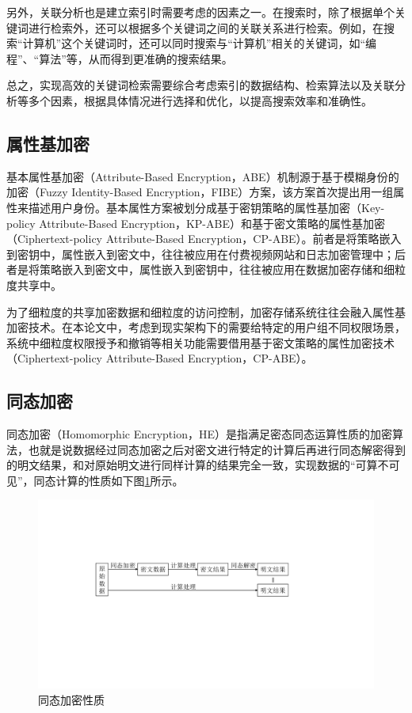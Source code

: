 \documentclass[promaster]{thesis-uestc}
\begin{document}
另外，关联分析也是建立索引时需要考虑的因素之一。在搜索时，除了根据单个关键词进行检索外，还可以根据多个关键词之间的关联关系进行检索。例如，在搜索“计算机”这个关键词时，还可以同时搜索与“计算机”相关的关键词，如“编程”、“算法”等，从而得到更准确的搜索结果。

总之，实现高效的关键词检索需要综合考虑索引的数据结构、检索算法以及关联分析等多个因素，根据具体情况进行选择和优化，以提高搜索效率和准确性。

\subsection{属性基加密}\label{属性基加密}

基本属性基加密（Attribute-Based Encryption，ABE）机制源于基于模糊身份的加密（Fuzzy Identity-Based Encryption，FIBE）方案，该方案首次提出用一组属性来描述用户身份。基本属性方案被划分成基于密钥策略的属性基加密（Key-policy Attribute-Based Encryption，KP-ABE）和基于密文策略的属性基加密（Ciphertext-policy Attribute-Based Encryption，CP-ABE）。前者是将策略嵌入到密钥中，属性嵌入到密文中，往往被应用在付费视频网站和日志加密管理中；后者是将策略嵌入到密文中，属性嵌入到密钥中，往往被应用在数据加密存储和细粒度共享中。

为了细粒度的共享加密数据和细粒度的访问控制，加密存储系统往往会融入属性基加密技术。在本论文中，考虑到现实架构下的需要给特定的用户组不同权限场景，系统中细粒度权限授予和撤销等相关功能需要借用基于密文策略的属性加密技术（Ciphertext-policy Attribute-Based Encryption，CP-ABE）。

\subsection{同态加密}\label{同态加密}

同态加密（Homomorphic Encryption，HE）是指满足密态同态运算性质的加密算法，也就是说数据经过同态加密之后对密文进行特定的计算后再进行同态解密得到的明文结果，和对原始明文进行同样计算的结果完全一致，实现数据的“可算不可见”，同态计算的性质如下图\ref{同态加密性质}所示。
\begin{figure}[htbp]
    \centering
    \includegraphics[width = 0.8\linewidth]{pic/同态加密性质.pdf}
    \caption{同态加密性质}
    \label{同态加密性质}
\end{figure}
\end{document}
